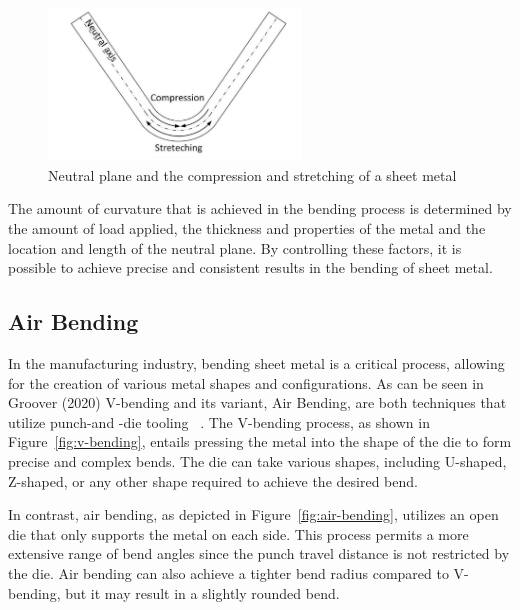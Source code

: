 \begin{figure}[h]
    \begin{tcolorbox}[arc=0pt,boxrule=0.5pt, colback=white]
        \centering
        \includegraphics[width=0.6\textwidth]{chap2/images/neutral-plane}
    \end{tcolorbox}
    \caption{Neutral plane and the compression and stretching of a sheet metal
    ~\cite[p. 3]{baig_machinelearningprediction_2021}}
    \label{fig:neutral-plane}
\end{figure}

The amount of curvature that is achieved in the bending process is determined by the
amount of load applied, the thickness and properties of the metal and the location and length of the neutral plane.
By controlling these factors, it is possible to achieve precise and consistent results in the bending of sheet metal.

\subsection{Air Bending}\label{subsec:air-bending}
In the manufacturing industry, bending sheet metal is a critical process, allowing for the creation of various metal
shapes and configurations.
As can be seen in Groover (2020) V-bending and its variant, Air Bending, are both techniques that utilize punch-and
-die tooling ~\cite[p. 416]{groover_fundamentalsmodernmanufacturing_2020}.
The V-bending process, as shown in Figure~\ref{fig:v-bending}, entails pressing the metal into the shape of the die
to form precise and complex bends.
The die can take various shapes, including U-shaped, Z-shaped, or any other shape required to achieve the desired bend.

In contrast, air bending, as depicted in Figure~\ref{fig:air-bending}, utilizes an open die that only supports the
metal on each side.
This process permits a more extensive range of bend angles since the punch travel distance is not
restricted by the die.
Air bending can also achieve a tighter bend radius compared to V-bending, but it may result in
a slightly rounded bend.

